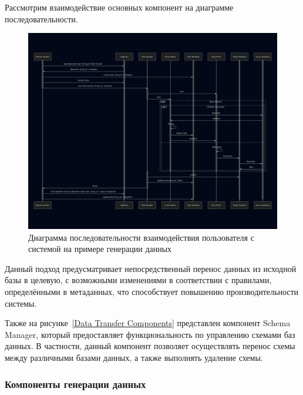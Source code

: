 Рассмотрим взаимодействие основных компонент на диаграмме последовательности.

\begin{figure}
  \includegraphics[scale=0.2]{./img/mermaid-sequence-DataTransfer.png}
  \caption{Диаграмма последовательности взаимодействия пользователя с системой на примере генерации данных}
  \label{Sequence DataTransferComponents}
\end{figure}

Данный подход предусматривает непосредственный перенос данных из исходной базы в целевую, с возможными изменениями в соответствии с правилами, определёнными в метаданных, что способствует повышению производительности системы.

Также на рисунке~\ref{Data Transfer Components} представлен компонент Schema Manager, который предоставляет функциональность по управлению схемами баз данных. В частности, данный компонент позволяет осуществлять перенос схемы между различными базами данных, а также выполнять удаление схемы.

\subsubsection{Компоненты генерации данных}

